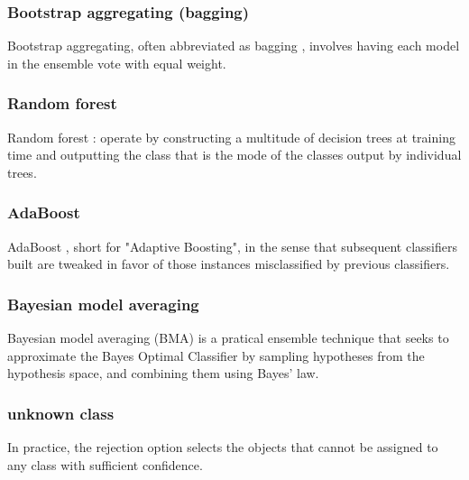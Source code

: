 \subsubsection{Bootstrap aggregating (bagging)}
Bootstrap aggregating, often abbreviated as bagging \cite{breiman1996bagging}, involves having each model in the ensemble vote with equal weight.

\subsubsection{Random forest}

Random forest \cite{breiman2001random}: operate by constructing a multitude of decision trees at training time and outputting the class that is the mode of the classes output by individual trees. 

\subsubsection{AdaBoost}



AdaBoost \cite{freund1997decision}, short for "Adaptive Boosting", in the sense that subsequent classifiers built are tweaked in favor of those instances misclassified by previous classifiers. 


\subsubsection{Bayesian model averaging}

Bayesian model averaging (BMA) \cite{hoeting1999bayesian}  is a pratical ensemble technique that seeks to approximate the Bayes Optimal Classifier by sampling hypotheses from the hypothesis space, and combining them using Bayes' law.

\subsubsection{unknown class}

In practice, the rejection option selects the objects that cannot be assigned to any class with sufficient confidence.